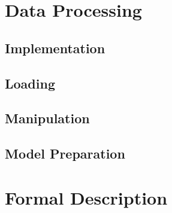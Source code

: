     \section{Data Processing}
    
        \subsection{Implementation}
        
        \subsection{Loading}
        
        \subsection{Manipulation}
        
        \subsection{Model Preparation}
        
    \section{Formal Description}
    
